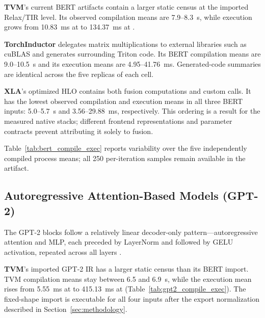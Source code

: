 \documentclass[sigconf]{acmart}
\renewcommand{\arraystretch}{1.1}
\DeclareRobustCommand{\tcode}[1]{\texttt{\seqsplit{#1}}}
\begin{document}
\textbf{TVM}'s current BERT artifacts contain a larger static \tcode{call\_tir} census at the imported Relax/TIR level. Its observed compilation means are 7.9--8.3~s, while execution grows from 10.83~ms at \tcode{(1,64)} to 134.37~ms at \tcode{(8,128)}.

\textbf{TorchInductor} delegates matrix multiplications to external libraries such as cuBLAS \cite{pytorch2022} and generates surrounding Triton code. Its BERT compilation means are 9.0--10.5~s and its execution means are 4.95--41.76~ms. Generated-code summaries are identical across the five replicas of each cell.

\textbf{XLA}'s optimized HLO contains both fusion computations and custom calls. It has the lowest observed compilation and execution means in all three BERT inputs: 5.0--5.7~s and 3.56--29.88~ms, respectively. This ordering is a result for the measured native stacks; different frontend representations and parameter contracts prevent attributing it solely to fusion.

Table~\ref{tab:bert_compile_exec} reports variability over the five independently compiled process means; all 250 per-iteration samples remain available in the artifact.

\subsection{Autoregressive Attention-Based Models (GPT-2)}

\begin{table}[t]
\centering
\caption{GPT-2 --- \textbf{compilation-cost proxy} and \textbf{execution} time (mean $\pm$ sample sd over \(K=5\) independent process means, ms); each process uses 10 warmups and 50 synchronized executions.}
\label{tab:gpt2_compile_exec}
\footnotesize
\renewcommand{\arraystretch}{1.0}
\end{table}

The GPT-2 blocks follow a relatively linear decoder-only pattern---autoregressive attention and MLP, each preceded by LayerNorm and followed by GELU activation, repeated across all layers \cite{radford2019language}.

\textbf{TVM}'s imported GPT-2 IR has a larger static \tcode{call\_tir} census than its BERT import. TVM compilation means stay between 6.5 and 6.9~s, while the execution mean rises from 5.55~ms at \tcode{(1,16)} to 415.13~ms at \tcode{(8,256)} (Table~\ref{tab:gpt2_compile_exec}). The fixed-shape import is executable for all four inputs after the export normalization described in Section~\ref{sec:methodology}.
\end{document}
